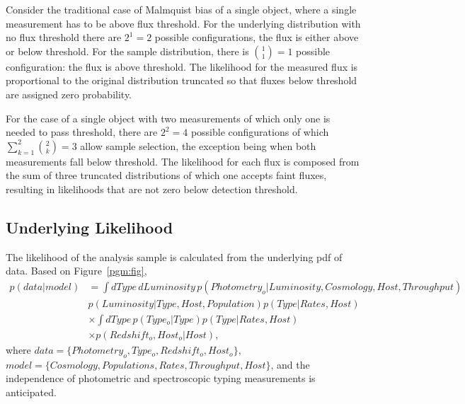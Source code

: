 \documentclass[preprint,3p]{elsarticle}
\begin{document}
Consider the traditional case of Malmquist bias of a single object,
where a single measurement has
to be above flux threshold.  For the underlying distribution with no flux threshold there
are $2^1=2$ possible configurations, the flux is either above or below threshold.  For
the sample distribution, there is $\binom{1}{1}=1$ possible configuration: the flux
is above threshold.   The likelihood for the measured flux is proportional to the original
distribution truncated so that fluxes below threshold are assigned zero probability.

For the case of a single object with two measurements of which only one is needed to
pass threshold,
there are $2^2=4$ possible configurations of which $\sum_{k=1}^{2} \binom{2}{k}=3$
allow sample selection, the exception being when both measurements fall below threshold.
The likelihood for each flux is composed from
the sum of three truncated distributions of which one accepts faint fluxes,
resulting in likelihoods that are not zero below detection threshold.

\subsection{Underlying Likelihood}
The likelihood of the analysis sample is calculated from the underlying pdf of data.  Based on Figure~\ref{pgm:fig},
\begin{align}
p(data|model) &=\int dType\, dLuminosity\, p(Photometry_o |  Luminosity, Cosmology,Host,Throughput)  \nonumber\\
& p(Luminosity| Type
, Host, Population) p(Type | Rates, Host)  \nonumber\\
& \times \int dType\, p(Type_o|Type) p(Type|Rates, Host) \nonumber \\
& \times p(Redshift_o, Host_o| Host),
\label{like:eqn}
\end{align}
where $data=\{Photometry_o, Type_o, Redshift_o, Host_o\}$,
$model=\{Cosmology, Populations, Rates, Throughput, Host\}$, and the independence
of photometric and spectroscopic typing measurements is anticipated.
\end{document}

